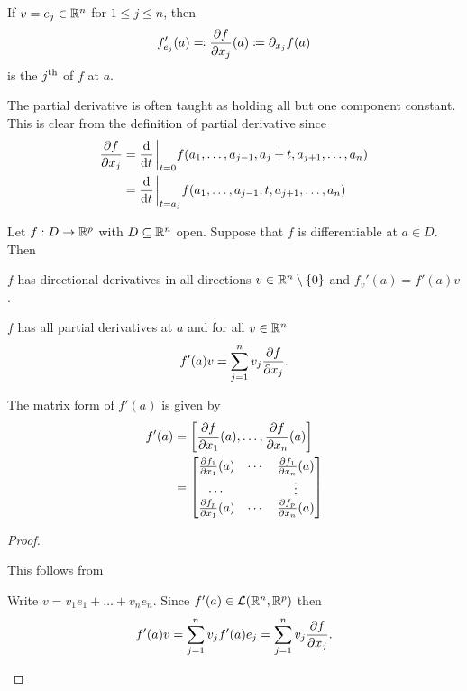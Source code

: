 \documentclass[../main.tex]{subfiles}
\begin{document}
\begin{definition}
    If $v = e_j \in \mathbb{R}^n$ for $1 \leq j \leq n$, then
    \[
        f'_{e_j}(a) \eqcolon \pdv{f}{x_j}\relax(a) \coloneq \partial_{x_j} f(a)
    \]
    is the $j^{\text{th}}$  of $f$ at $a$.
\end{definition}

\begin{remark}
    The partial derivative is often taught as holding all but one component constant. This is clear from the definition of partial derivative since
    \begin{align*}
        \pdv{f}{x_j}(a) &= \dv{t} \eval_{t=0} f(a_1, \ldots, a_{j-1}, a_{j} + t, a_{j+1}, \ldots, a_n) \\
                        &= \dv{t} \eval_{t=a_j} f(a_1, \ldots, a_{j-1}, t, a_{j+1}, \ldots, a_n)
    \end{align*}
\end{remark}

\begin{theorem}
    Let $f : D \to \mathbb{R}^p$ with $D \subseteq \mathbb{R}^n$ open. Suppose that $f$ is differentiable at $a \in D$. Then
    \begin{romanlist}
        \item $f$ has directional derivatives in all directions $v \in \mathbb{R}^n \setminus \qty{0}$ and $f_v'(a) = f'(a) v$.
        \item $f$ has all partial derivatives at $a$ and for all $v \in \mathbb{R}^n$
            \[
                f'(a) v = \sum_{j=1}^n v_j \pdv{f}{x_j}
            .\]
        \item The matrix form of $f'(a)$ is given by
            \begin{align*}
                f'(a) &= \qty[\pdv{f}{x_1}\relax(a), \ldots, \pdv{f}{x_n}\relax(a)] \\
                      &= \mqty[
                      \pdv{f_1}{x_1}\relax(a) & \cdots & \pdv{f_1}{x_n}\relax(a) \\
                      \cdots            &        & \vdots            \\
                      \pdv{f_p}{x_1}\relax(a) & \cdots & \pdv{f_p}{x_n}\relax(a)
                      ]
            \end{align*}
    \end{romanlist}
\end{theorem}

\begin{proof}
    \begin{romanlist}
        \item This follows from 
        \item Write $v = v_1 e_1 + \ldots + v_n e_n$. Since $f'(a) \in \mathcal{L}(\mathbb{R}^n, \mathbb{R}^p)$ then
            \[
                f'(a) v = \sum_{j=1}^n v_j f'(a) e_j = \sum_{j=1}^n v_j \pdv{f}{x_j}(a)
            .\]
    \end{romanlist}
\end{proof}
\end{document}
